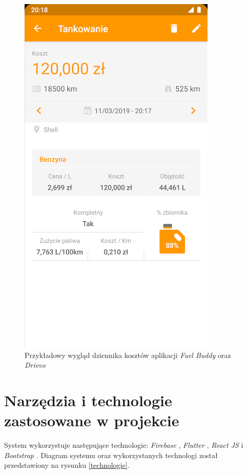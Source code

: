 \documentclass[12pt]{article}
\begin{document}
\begin{figure}
		\includegraphics[scale=0.7]{mob2.png}
	\caption{Przykładowy wygląd dziennika kosztów aplikacji \textit{Fuel Buddy} \cite{fuel} oraz \textit{Drivvo} \cite{drivvo}}
	\label{mob}
\end{figure}


 


\newpage
\section{Narzędzia i technologie zastosowane w projekcie}

System wykorzystuje następujące technologie: \textit{Firebase} \cite{firebase}, \textit{Flutter} \cite{flutter}, \textit{React JS} \cite{react} i \textit{Bootstrap} \cite{bootstrap}. Diagram systemu oraz wykorzystanych technologi został przedstawiony na rysunku \ref{technologie}.
\end{document}

